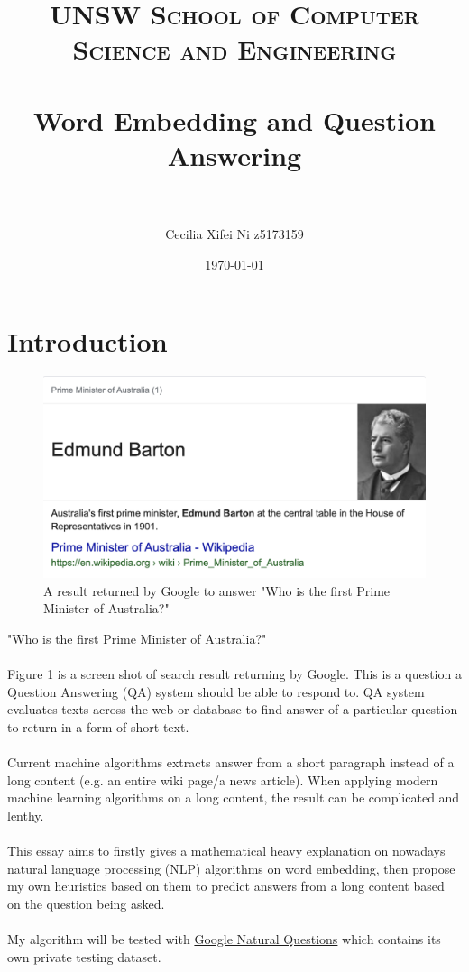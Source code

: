 \documentclass[paper=a4, fontsize=12pt]{scrartcl}
\title{	\normalfont \normalsize
\textsc{UNSW School of Computer Science and Engineering} \\ [24pt]
\horrule{1pt} \\[0.5cm] %
\LARGE Word Embedding and Question Answering \\ %
\horrule{1pt} \\[0.5cm] %
}
\author{Cecilia Xifei Ni z5173159} %
\date{\normalsize\today} %
\begin{document}
\thispagestyle{empty}

\maketitle %
\section{Introduction}
\begin{figure}
  \includegraphics[width=\linewidth]{google.png}
  \caption{A result returned by Google to answer "Who is the first Prime Minister of Australia?"}
  \label{fig:google}
\end{figure}
"Who is the first Prime Minister of Australia?" \\\\
Figure 1 is a screen shot of search result returning by Google. This is a question a Question Answering (QA) system should be able to respond to. QA system evaluates texts across the web or database to find answer of a particular question to return in a form of short text.\\\\
Current machine algorithms extracts answer from a short paragraph instead of a long content (e.g. an entire wiki page/a news article). When applying modern machine learning algorithms on a long content, the result can be complicated and lenthy. \\\\
This essay aims to firstly gives a mathematical heavy explanation on nowadays natural language processing (NLP) algorithms on word embedding, then propose my own heuristics based on them to predict answers from a long content based on the question being asked. \\\\
My algorithm will be tested with \href{https://ai.google.com/research/NaturalQuestions/dataset}{Google Natural Questions} which contains its own private testing dataset. 
\end{document}
